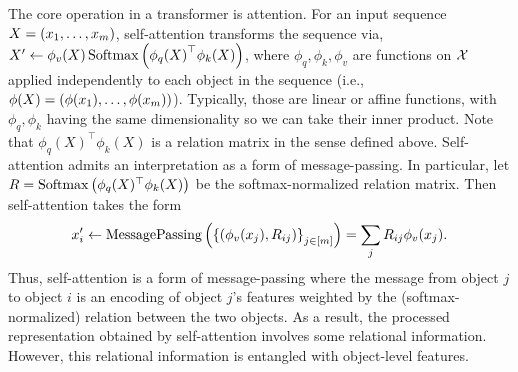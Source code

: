 The core operation in a transformer is attention. For an input sequence $X = \left(x_1, \ldots, x_m\right)$, self-attention transforms the sequence via, $ X' \gets \phi_v(X) \, \mathrm{Softmax}\left({\phi_q(X)}^\top \phi_k(X)\right)$,
where $\phi_q, \phi_k, \phi_v$ are functions on ${\mathcal{X}}$ applied independently to each object in the sequence (i.e., $\phi(X) = \left(\phi(x_1), \ldots, \phi(x_m)\right)$). Typically, those are linear or affine functions, with $\phi_q, \phi_k$ having the same dimensionality so we can take their inner product. Note that $\phi_q(X)^\top \phi_k(X)$ is a relation matrix in the sense defined above. Self-attention admits an interpretation as a form of message-passing. In particular, let $R = \mathrm{Softmax}\left(\phi_q(X)^\top \phi_k(X)\right)$ be the softmax-normalized relation matrix. Then self-attention takes the form
\begin{equation}\label{eq:self_attn_message_passing}
    x_i' \gets \mathrm{MessagePassing}\left(\left\{(\phi_v(x_j), R_{ij})\right\}_{j \in [m]}\right) = \sum_{j} R_{ij} \phi_v(x_j).
\end{equation}
Thus, self-attention is a form of message-passing where the message from object $j$ to object $i$ is an encoding of object $j$'s features weighted by the (softmax-normalized) relation between the two objects. As a result, the processed representation obtained by self-attention involves some relational information. However, this relational information is entangled with object-level features.

